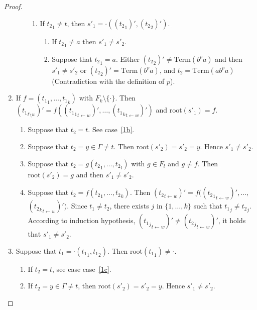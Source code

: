 \documentclass[a4paper]{llncs}
\begin{document}
\begin{proof}
\begin{enumerate}
\begin{enumerate}
\begin{enumerate}
    \item If ${t_2}_1\neq t$, then $s'_1=\cdot(({t_2}_1)',({t_2}_2)')$.
    \begin{enumerate}
    \item If ${t_2}_1\neq a$ then $s'_1\neq s'_2$.
    
    \item Suppose that ${t_2}_1= a$.  Either $({t_2}_2)'\neq\mathrm{Term}(b^pa)$ and then $s'_1\neq s'_2$ or $({t_2}_2)'=\mathrm{Term}(b^pa)$, and $t_2=\mathrm{Term}(ab^pa)$  (Contradiction with the definition of $p$).
    \end{enumerate}
    \end{enumerate}
    \end{enumerate}
    
    \item  If $f=({t_1}_1,\ldots,{t_1}_k)$ with $F_k\setminus\{\cdot\}$. Then $({t_1}_{t\setminus w})'=f(({{t_1}_1}_{t\leftarrow w})',\ldots,({{t_1}_k}_{t\leftarrow w})')$ and $\mathrm{root}(s'_1)=f$.
    \begin{enumerate}
    \item  Suppose that $t_2=t$. See case~\ref{1b}.
    
    \item Suppose that $t_2=y\in\Gamma\neq t$. Then $\mathrm{root}(s'_2)=s'_2=y$. Hence $s'_1\neq s'_2$.
    
    \item\label{2c} Suppose that $t_2=g({t_2}_1,\ldots,{t_2}_l)$ with $g\in F_l$ and $g\neq f$. Then $\mathrm{root}(s'_2)=g$ and then $s'_1\neq s'_2$.
    
    \item Suppose that $t_2=f({t_2}_1,\ldots,{t_2}_k)$. Then $({t_2}_{t\leftarrow w})'=f(({{t_2}_1}_{t\leftarrow w})',\ldots,$ $({{t_2}_k}_{t\leftarrow w})')$. Since $t_1\neq t_2$, there exists $j$ in $\{1,\ldots,k\}$ such that ${t_1}_j\neq{t_2}_j$. According to induction hypothesis, $({{t_1}_j}_{t\leftarrow w})'\neq ({{t_2}_j}_{t\leftarrow w})'$, it holds that $s'_1\neq s'_2$.
    \end{enumerate}
    \item  Suppose that $t_1=\cdot({t_1}_1,{t_1}_2)$. Then $\mathrm{root}({t_1}_1)\neq \cdot$.
    \begin{enumerate}
    \item If $t_2=t$, see case case~\ref{1c}.
    
    \item If $t_2=y\in\Gamma\neq t$, then $\mathrm{root}(s'_2)=s'_2=y$. Hence $s'_1\neq s'_2$. 
    

\end{enumerate}
\end{enumerate}
\end{proof}
\end{document}
